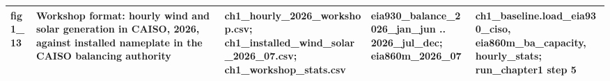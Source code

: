 \begin{tabular}{lp{4.6cm}p{5.2cm}p{4.6cm}p{4.8cm}}
fig1\_\allowbreak{}13 & Workshop format: hourly wind and solar generation in CAISO, 2026, against installed nameplate in the CAISO balancing authority & ch1\_\allowbreak{}hourly\_\allowbreak{}2026\_\allowbreak{}workshop.csv; ch1\_\allowbreak{}installed\_\allowbreak{}wind\_\allowbreak{}solar\_\allowbreak{}2026\_\allowbreak{}07.csv; ch1\_\allowbreak{}workshop\_\allowbreak{}stats.csv & eia930\_\allowbreak{}balance\_\allowbreak{}2026\_\allowbreak{}jan\_\allowbreak{}jun .. 2026\_\allowbreak{}jul\_\allowbreak{}dec; eia860m\_\allowbreak{}2026\_\allowbreak{}07 & ch1\_\allowbreak{}baseline.load\_\allowbreak{}eia930\_\allowbreak{}ciso, eia860m\_\allowbreak{}ba\_\allowbreak{}capacity, hourly\_\allowbreak{}stats; run\_\allowbreak{}chapter1 step 5 \\
\bottomrule
\end{tabular}